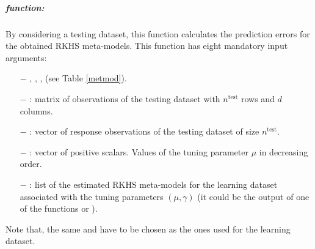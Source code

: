 \subparagraph*{ function:} 
By considering a testing dataset, this function calculates the prediction errors for the obtained RKHS meta-models. This function has eight mandatory input arguments:
\begin{itemize}
\item[$-$] , , ,  (see Table \ref{metmod}).
\item[$-$] : matrix of observations of the testing dataset with $n^{\text{test}}$ rows and $d$ columns.
\item[$-$] : vector of response observations of the testing dataset of size $n^{\text{test}}$.
\item[$-$] : vector of positive scalars. Values of the tuning parameter $\mu$ in decreasing order.
\item[$-$] : list of the estimated RKHS meta-models for the learning dataset associated with the tuning parameters $(\mu,\gamma)$ (it could be the output of one of the functions  or ).
\end{itemize}
Note that, the same  and  have to be chosen as the ones used for the learning dataset.


